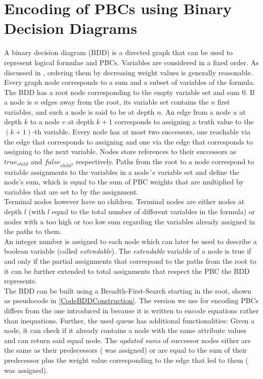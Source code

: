 \section{Encoding of PBCs using Binary Decision Diagrams}\label{PBCEncodingBDD}
A binary decision diagram (BDD) is a directed graph that can be used to represent logical formulae and PBCs. 
Variables are considered in a fixed order. As discussed in \cite{Een2006TranslatingPC}, ordering them by decreasing weight values is generally reasonable. Every graph node corresponds to a sum and a subset of variables of the formula. The BDD has a root node corresponding to the empty variable set and sum 0. If a node is $n$ edges away from the root, its variable set contains the $n$ first variables, and such a node is said to be at depth $n$. An edge from a node $u$ at depth $k$ to a node $v$ at depth $k+1$ corresponds to assigning a truth value to the $(k+1)$-th variable. Every node has at most two successors, one reachable via the edge that corresponds to assigning \true{} and one via the edge that corresponds to assigning \false{} to the next variable. Nodes store references to their successors as \emph{$\textit{true}_{child}$} and \emph{$\textit{false}_{child}$}, respectively. Paths from the root to a node correspond to variable assignments to the variables in a node´s variable set and define the node's sum, which is equal to the sum of PBC weights that are multiplied by variables that are set to \true{} by the assignment.\\

Terminal nodes however have no children. Terminal nodes are either nodes at depth $l$ (with $l$ equal to the total number of different variables in the formula) or nodes with a too high or too low sum regarding the variables already assigned in the paths to them.\\

An integer number is assigned to each node which can later be used to describe a boolean variable (called \emph{extendable}). The  \emph{extendable} variable of a node is true if and only if the partial assignments that correspond to the paths from the root to it can be further extended to total assignments that respect the PBC the BDD represents.\\

The BDD can be built using a Breadth-First-Search starting in the root, shown as pseudocode in \ref{CodeBDDConstruction}. The version we use for encoding PBCs differs from the one introduced in \cite{Een2006TranslatingPC} because it is written to encode equations rather than inequations. Further, the used queue has additional functionalities: Given a node, it can check if it already contains a node with the same attribute values and can return said equal node. The \emph{updated sums} of successor nodes either are the same as their predecessors (\false{} was assigned) or are equal to the sum of their predecessor plus the weight value corresponding to the edge that led to them (\true{} was assigned).




